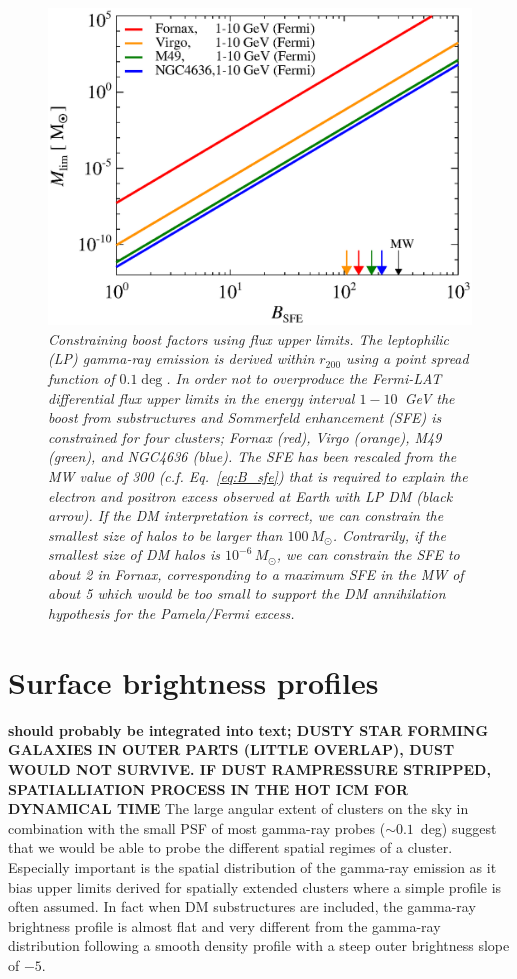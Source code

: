 \documentclass[10pt,aps,pra,reprint,amsmath,amsfonts,amssymb,showpacs,nofootinbib,floatfix]{revtex4-1}
\newcommand{\msun}{M_\odot}
\newcommand{\rvir}{r_{200}}
\begin{document}
\begin{figure}%
 \includegraphics[width=0.99\columnwidth]{figures/LP.const.diff.v11.0.1deg.1.6T.SubMass.SF300.IR2.noMW.woGal.eps}
 \caption{\it Constraining boost factors using flux upper limits. The
   leptophilic (LP) gamma-ray emission is derived within $\rvir$ using
   a point spread function of $0.1\deg$. In order not to overproduce
   the Fermi-LAT differential flux upper limits in the energy interval
   $1-10$~GeV the boost from substructures and Sommerfeld enhancement
   (SFE) is constrained for four clusters; Fornax (red), Virgo
   (orange), M49 (green), and NGC4636 (blue). The SFE has been
   rescaled from the MW value of 300 (c.f. Eq.~\ref{eq:B_sfe}) that is
   required to explain the electron and positron excess observed at
   Earth with LP DM (black arrow). If the DM interpretation is
   correct, we can constrain the smallest size of halos to be larger
   than $100\,\msun$. Contrarily, if the smallest size of DM halos is
   $10^{-6}\,\msun$, we can constrain the SFE to about 2 in Fornax,
   corresponding to a maximum SFE in the MW of about 5 which would be
   too small to support the DM annihilation hypothesis for the
   Pamela/Fermi excess.}
 \label{fig:boost_const}
\end{figure}



\section{Surface brightness profiles}
\label{sect:spatial}
{\bf should probably be integrated into text; DUSTY STAR FORMING
  GALAXIES IN OUTER PARTS (LITTLE OVERLAP), DUST WOULD NOT SURVIVE. IF
  DUST RAMPRESSURE STRIPPED, SPATIALLIATION PROCESS IN THE HOT ICM FOR
  DYNAMICAL TIME} The large angular extent of clusters on the sky in
combination with the small PSF of most gamma-ray probes ($\sim
0.1$~deg) suggest that we would be able to probe the different spatial
regimes of a cluster. Especially important is the spatial distribution
of the gamma-ray emission as it bias upper limits derived for
spatially extended clusters where a simple profile is often
assumed. In fact when DM substructures are included, the gamma-ray
brightness profile is almost flat and very different from the
gamma-ray distribution following a smooth density profile with a steep
outer brightness slope of $-5$.
\end{document}
